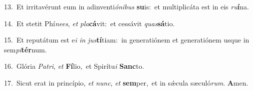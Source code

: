 {\numbfont\textcolor{\numbcolor}{13.}}~Et irritavérunt eum in adinventi\-\textit{ó}\-\textit{ni}\textit{bus} \textbf{su}\-is:~\star et multiplicáta est in eis \textit{ru}\-\textbf{í}na.\par
{\numbfont\textcolor{\numbcolor}{14.}}~Et stetit Phí\-\textit{nees}\-, \textit{et} \textit{pla}\-\textbf{cá}vit:~\star et cessávit \textit{quas}\-\textbf{sá}tio.\par
{\numbfont\textcolor{\numbcolor}{15.}}~Et reputátum est e\textit{i} \textit{in} \textit{jus}\-\textbf{tí}tiam:~\star in generatiónem et generatiónem usque in sem\-\textit{pi}\-\textbf{tér}num.\par
{\numbfont\textcolor{\numbcolor}{16.}}~Glória \textit{Pa}\-\textit{tri}, \textit{et} \textbf{Fí}\-lio,~\star et Spirítu\textit{i} \textbf{Sanc}\-to.\par
{\numbfont\textcolor{\numbcolor}{17.}}~Sicut erat in princípio, \textit{et} \textit{nunc}\-, \textit{et} \textbf{sem}\-per,~\star et in sǽcula sæculó\-\textit{rum}\-. \textbf{A}\-men.\par
